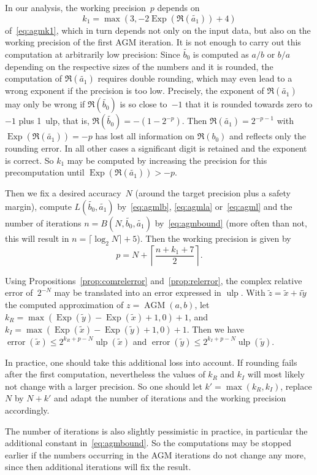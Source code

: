 \documentclass [11pt]{article}
\newcommand {\corr}[1]{{#1}}
\newcommand {\appro}[1]{\widetilde {#1}}
\newcommand {\ulp}[1]{#1~ulp}
\newcommand {\Ulp}{{\operatorname {ulp}}}
\DeclareMathOperator{\Exp}{\operatorname {Exp}}
\newcommand{\error}{\operatorname {error}}
\renewcommand {\leq}{\leqslant}
\newcommand {\AGM}{\operatorname{AGM}}
\begin{document}
In our analysis, the working precision~$p$ depends on
\[
k_1 = \max (3, - 2 \Exp (\Re (\appro {a_1})) + 4)
\]
of~\eqref {eq:agmk1}, which in turn depends not only on the input data,
but also on the working precision of the first AGM iteration. It is not
enough to carry out this computation at arbitrarily low precision:
Since $\appro {b_0}$ is computed as $a / b$ or $b / a$ depending on the
respective sizes of the numbers and it is rounded, the computation
of $\Re (\appro {a_1})$ requires double rounding, which may even lead to a
wrong exponent if the precision is too low. Precisely, the exponent of
$\Re (\appro {a_1})$ may only be wrong if $\Re (\appro {b_0})$ is so close
to~$-1$ that it is rounded towards zero to $-1$ plus \ulp {1}, that is,
$\Re (\appro {b_0}) = - (1 - 2^{-p})$. Then
$\Re (\appro {a_1}) = 2^{- p - 1}$ with $\Exp (\Re (\appro {a_1})) = -p$
has lost all information on $\Re (b_0)$ and reflects only the rounding
error. In all other cases a significant digit is retained and the exponent
is correct. So $k_1$ may be computed by increasing the precision for
this precomputation until $\Exp (\Re (\appro {a_1})) > -p$.

Then we fix a desired accuracy~$N$ (around the target precision plus a
safety margin), compute $L (\appro {b_0}, \appro {a_1})$
by~\eqref {eq:agmlb}, \eqref {eq:agmla} or~\eqref {eq:agml} and
the number of iterations
$n = B (N, \appro {b_0}, \appro {a_1})$ by~\eqref {eq:agmbound}
(more often than not, this will result in $n = \lceil \log_2 N \rceil + 5$).
Then the working precision is given by
\[
p = N + \left\lceil \frac {n + k_1 + 7}{2} \right\rceil.
\]

Using Propositions~\ref {prop:comrelerror} and~\ref {prop:relerror}, the
complex relative error of~$2^{-N}$ may be translated into an error
expressed in $\Ulp$.
With $\appro {z} = \appro x + i \appro y$
the computed approximation of $\corr {z} = \AGM (a, b)$, let
$k_R = \max (\Exp (\appro y) - \Exp (\appro x) + 1, 0) + 1$, and
$k_I = \max (\Exp (\appro x) - \Exp (\appro y) + 1, 0) + 1$.
Then we have
$\error (\appro x) \leq 2^{k_R + p - N} \Ulp (\appro x)$ and
$\error (\appro y) \leq 2^{k_I + p - N} \Ulp (\appro y)$.

In practice, one should take this additional loss into account.
If rounding fails after the first computation, nevertheless the values of
$k_R$ and $k_I$ will most likely not change with a larger precision.
So one should let $k' = \max (k_R, k_I)$, replace $N$ by $N + k'$
and adapt the number of iterations and the working precision accordingly.

The number of iterations is also slightly pessimistic in practice,
in particular the additional constant in~\eqref {eq:agmbound}.
So the computations may be stopped earlier if the numbers occurring in
the AGM iterations do not change any more, since then additional
iterations will fix the result.

\nocite{Baudin11,Stewart85,Priest04,muller:hal-01766584,jeannerod:ensl-01780265}


\end{document}
